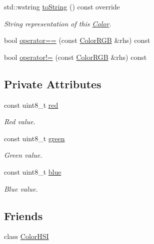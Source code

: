 \begin{DoxyCompactItemize}
std\+::wstring \hyperlink{classmastermind_1_1logic_1_1_color_r_g_b_ab80986e7ab151d26d47ad28d153a6a88}{to\+String} () const override
\begin{DoxyCompactList}\small\item\em String representation of this \hyperlink{classmastermind_1_1logic_1_1_color}{Color}. \end{DoxyCompactList}\item 
bool \hyperlink{classmastermind_1_1logic_1_1_color_r_g_b_abe96ac5c31537e3bafaa52d1eab98a2f}{operator==} (const \hyperlink{classmastermind_1_1logic_1_1_color_r_g_b}{Color\+R\+GB} \&rhs) const
\item 
bool \hyperlink{classmastermind_1_1logic_1_1_color_r_g_b_ab81f315c0d1bba56d40a1766b51b0273}{operator!=} (const \hyperlink{classmastermind_1_1logic_1_1_color_r_g_b}{Color\+R\+GB} \&rhs) const
\end{DoxyCompactItemize}
\subsection*{Private Attributes}
\begin{DoxyCompactItemize}
\item 
const uint8\+\_\+t \hyperlink{classmastermind_1_1logic_1_1_color_r_g_b_a8f9661c51195e67f2c22009805e6b3d2}{red}
\begin{DoxyCompactList}\small\item\em Red value. \end{DoxyCompactList}\item 
const uint8\+\_\+t \hyperlink{classmastermind_1_1logic_1_1_color_r_g_b_abcdd46578394ad832e79ccf2affdd51e}{green}
\begin{DoxyCompactList}\small\item\em Green value. \end{DoxyCompactList}\item 
const uint8\+\_\+t \hyperlink{classmastermind_1_1logic_1_1_color_r_g_b_a9bfa135c10da9636ed9c0c1310b50731}{blue}
\begin{DoxyCompactList}\small\item\em Blue value. \end{DoxyCompactList}\end{DoxyCompactItemize}
\subsection*{Friends}
\begin{DoxyCompactItemize}
\item 
class \hyperlink{classmastermind_1_1logic_1_1_color_r_g_b_ada143533c2a424e783d7a68a213d6537}{Color\+H\+SI}
\end{DoxyCompactItemize}
